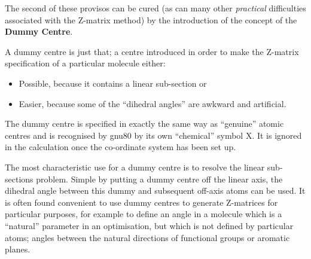 The second of these provisos can be cured (as can many other
{\em practical} difficulties associated with the Z-matrix method)
by the introduction of the concept of the {\bf Dummy Centre}.

A dummy centre is just that; a centre introduced in order to
make the Z-matrix specification of a particular molecule either: 
\begin{itemize}
\item Possible, because it contains a linear sub-section or 
\item Easier, because some of the ``dihedral angles'' are awkward
and artificial. 
\end{itemize}
The dummy centre is specified in exactly the same way as ``genuine''
atomic centres and is recognised by gnu80 by its own ``chemical''
symbol X. It is ignored in the calculation once the co-ordinate system
has been set up.

The most characteristic use for a dummy centre is to resolve the
linear sub-sections problem. Simple by putting a dummy centre off the
linear axis, the dihedral angle between this dummy and subsequent off-axis
atoms can be used.  It is often found convenient to use dummy centres
to generate Z-matrices for particular purposes, for example to define
an angle in a molecule which is a ``natural'' parameter in
an optimisation, but which is not defined by particular atoms; angles
between the natural directions of functional groups or aromatic
planes.
